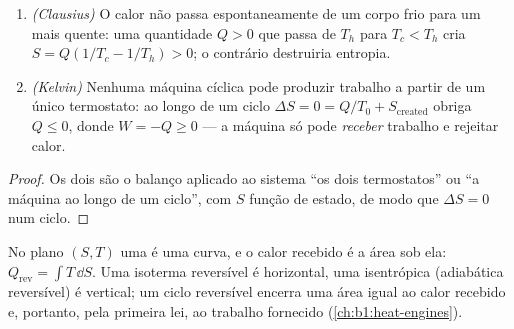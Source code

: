 \begin{proposition}\label{prop:b1:second-law-entropy:clausiuskelvin}
\begin{enumerate}
  \item \emph{(Clausius)} O calor não passa espontaneamente de um corpo
        frio para um mais quente: uma quantidade $Q > 0$ que passa de $T_h$
        para $T_c < T_h$ cria $S = Q(1/T_c - 1/T_h) > 0$; o contrário
        destruiria entropia.
  \item \emph{(Kelvin)} Nenhuma máquina cíclica pode produzir trabalho a
        partir de um único termostato: ao longo de um ciclo $\Delta S = 0 = Q/T_0 + S_{\mathrm{created}}$
        obriga $Q \leq 0$, donde $W = -Q \geq 0$ --- a máquina só pode
        \emph{receber} trabalho e rejeitar calor.
\end{enumerate}
\end{proposition}

\begin{proof}
Os dois são o balanço aplicado ao sistema ``os dois termostatos'' ou
``a máquina ao longo de um ciclo'', com $S$ função de estado, de modo que $\Delta S
= 0$ num ciclo.
\end{proof}

\begin{definition}\label{def:b1:second-law-entropy:TS}
No plano $(S, T)$ uma  é uma curva, e o calor
recebido é a área sob ela: $Q_{\mathrm{rev}} = \int T\,\dd S$. Uma isoterma
reversível é horizontal, uma isentrópica (adiabática reversível) é
vertical; um ciclo reversível encerra uma área igual ao calor recebido e,
portanto, pela primeira lei, ao trabalho fornecido
(\cref{ch:b1:heat-engines}).
\end{definition}

